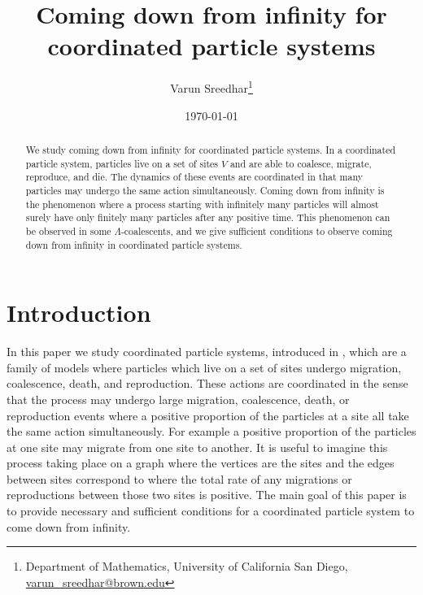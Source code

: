 \documentclass[11pt]{article}
\title{Coming down from infinity for coordinated particle systems}
\author{Varun Sreedhar\thanks{Department of Mathematics, University of California San Diego, \href{mailto:varun_sreedhar@brown.edu}{varun\_sreedhar@brown.edu}}}
\date{\today}
\theoremstyle{definition}
\begin{document}

\maketitle

\begin{abstract}
    We study coming down from infinity for coordinated particle systems. In a coordinated particle system, particles live on a set of sites $V$ and are able to coalesce, migrate, reproduce, and die. The dynamics of these events are coordinated in that many particles may undergo the same action simultaneously. Coming down from infinity is the phenomenon where a process starting with infinitely many particles will almost surely have only finitely many particles after any positive time. This phenomenon can be observed in some $\Lambda$-coalescents, and we give sufficient conditions to observe coming down from infinity in coordinated particle systems.
\end{abstract}

\section{Introduction} 

\noindent In this paper we study coordinated particle systems, introduced in \cite{CPS2021}, which are a family of models where particles which live on a set of sites undergo migration, coalescence, death, and reproduction. These actions are coordinated in the sense that the process may undergo large migration, coalescence, death, or reproduction events where a positive proportion of the particles at a site all take the same action simultaneously. For example a positive proportion of the particles at one site may migrate from one site to another. It is useful to imagine this process taking place on a graph where the vertices are the sites and the edges between sites correspond to where the total rate of any migrations or reproductions between those two sites is positive. The main goal of this paper is to provide necessary and sufficient conditions for a coordinated particle system to come down from infinity.

\end{document}
